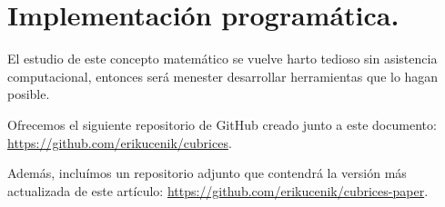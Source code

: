 \section{Implementación programática.}

El estudio de este concepto matemático se vuelve harto tedioso sin asistencia computacional, entonces será menester desarrollar herramientas que lo hagan posible.

Ofrecemos el siguiente repositorio de GitHub creado junto a este documento: \href{https://github.com/erikucenik/cubrices}{https://github.com/erikucenik/cubrices}.

Además, incluímos un repositorio adjunto que contendrá la versión más actualizada de este artículo: \href{https://github.com/erikucenik/cubrices-paper}{https://github.com/erikucenik/cubrices-paper}.
